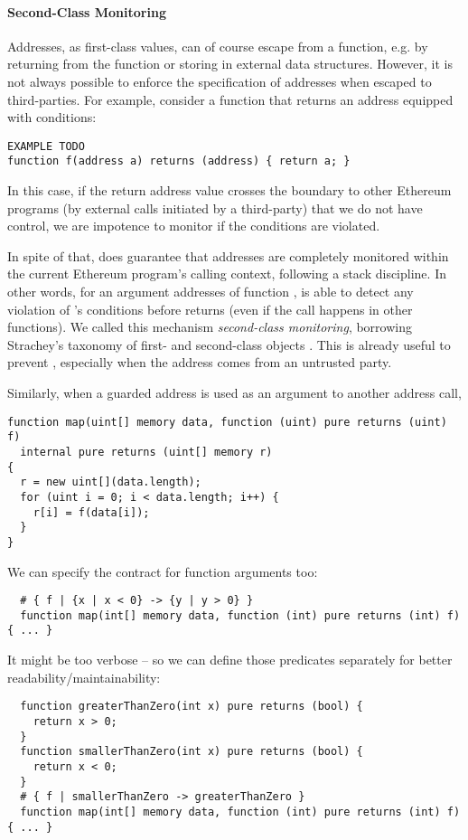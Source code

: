 \paragraph{Second-Class Monitoring}
Addresses, as first-class values, can of course escape from a function, e.g.
by returning from the function or storing in external data structures.
However, it is not always possible to enforce the specification
of addresses when escaped to third-parties.
For example, consider a function that returns an address equipped with
conditions:
\begin{lstlisting}
EXAMPLE TODO
function f(address a) returns (address) { return a; }
\end{lstlisting}
In this case, if the return address value crosses the boundary to other
Ethereum programs (by external calls initiated by a third-party) that we do not
have control, we are impotence to monitor if the conditions are violated.

In spite of that, \lang does guarantee that addresses are completely monitored
within the current Ethereum program's calling context, following a stack
discipline.
In other words, for an argument addresses  of function ,
\lang is able to detect any violation of 's conditions before
 returns (even if the call happens in other functions).
We called this mechanism \emph{second-class monitoring}, borrowing Strachey's taxonomy
of first- and second-class objects \cite{DBLP:journals/lisp/Strachey00}.
This is already useful to prevent  , especially when
the address comes from an untrusted party.

Similarly, when a guarded address is used as an argument to another address
call, 
\fi

\iffalse
	\begin{lstlisting}
function map(uint[] memory data, function (uint) pure returns (uint) f)
  internal pure returns (uint[] memory r)
{
  r = new uint[](data.length);
  for (uint i = 0; i < data.length; i++) {
    r[i] = f(data[i]);
  }
}
\end{lstlisting}

We can specify the contract for function arguments too:
\begin{lstlisting}
  # { f | {x | x < 0} -> {y | y > 0} }
  function map(int[] memory data, function (int) pure returns (int) f) { ... }
\end{lstlisting}
It might be too verbose -- so we can define those predicates separately for better readability/maintainability:
\begin{lstlisting}
  function greaterThanZero(int x) pure returns (bool) {
    return x > 0;
  }
  function smallerThanZero(int x) pure returns (bool) {
    return x < 0;
  }
  # { f | smallerThanZero -> greaterThanZero }
  function map(int[] memory data, function (int) pure returns (int) f) { ... }
\end{lstlisting}

